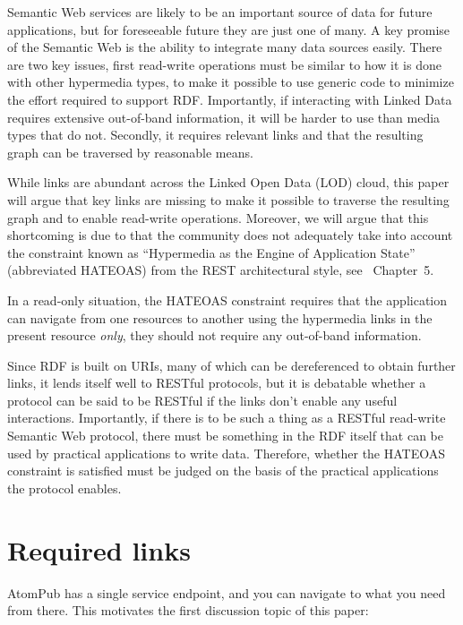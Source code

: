 \documentclass{llncs}
\begin{document}
Semantic Web services are likely to be an important source of data for
future applications, but for foreseeable future they are just one of many. A
key promise of the Semantic Web is the ability to integrate many data
sources easily. There are two key issues, first read-write operations
must be similar to how it is done with other hypermedia types, to make
it possible to use generic code to minimize the effort required to
support RDF. Importantly, if interacting with Linked Data requires
extensive out-of-band information, it will be harder to use than media
types that do not. Secondly, it requires relevant links and that the
resulting graph can be traversed by reasonable means.

While links are abundant across the Linked Open Data (LOD) cloud, this paper will
argue that key links are missing to make it possible to traverse the
resulting graph and to enable read-write operations. Moreover, we will
argue that this shortcoming is due to that the community does not
adequately take into account the constraint known as ``Hypermedia as
the Engine of Application State'' (abbreviated HATEOAS) from
the REST architectural style, see
\cite{Fielding_2000_Architectural-Styles}~Chapter~5.

In a read-only situation, the HATEOAS constraint requires that the
application can navigate from one resources to another using the
hypermedia links in the present resource \emph{only}, they should not
require any out-of-band information.

Since RDF is built on URIs, many of which can be dereferenced to
obtain further links, it lends itself well to RESTful protocols, but
it is debatable whether a protocol can be said to be RESTful if the
links don't enable any useful interactions. Importantly, if there is
to be such a thing as a RESTful read-write Semantic Web protocol,
there must be something in the RDF itself that can be used by
practical applications to write data. Therefore, whether the HATEOAS
constraint is satisfied must be judged on the basis of the practical
applications the protocol enables.

\section{Required links}

AtomPub has a single service endpoint,
and you can navigate to what you need from there. This motivates the
first discussion topic of this paper:
\end{document}
